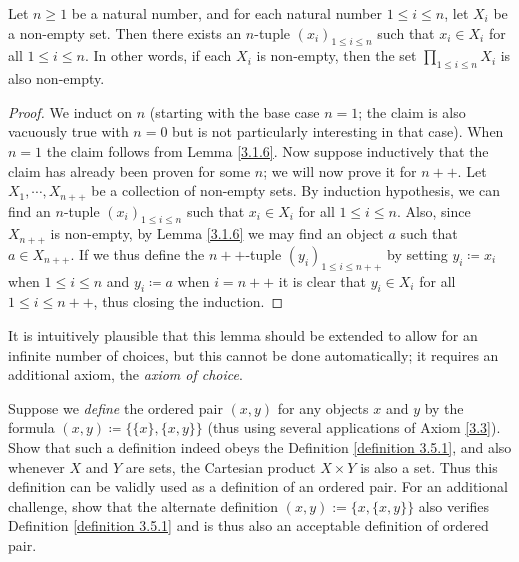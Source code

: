 \begin{lemma}\label{lemma 3.5.1}
Let \(n \geq 1\) be a natural number, and for each natural number \(1 \leq i \leq n\), let \(X_i\) be a non-empty set.
Then there exists an \(n\)-tuple \((x_i)_{1 \leq i \leq n}\) such that \(x_i \in X_i\) for all \(1 \leq i \leq n\).
In other words, if each \(X_i\) is non-empty, then the set \(\prod_{1 \leq i \leq n} X_i\) is also non-empty.
\end{lemma}

\begin{proof}
We induct on \(n\) (starting with the base case \(n = 1\); the claim is also vacuously true with \(n = 0\) but is not particularly interesting in that case).
When \(n = 1\) the claim follows from Lemma \ref{3.1.6}.
Now suppose inductively that the claim has already been proven for some \(n\);
we will now prove it for \(n++\).
Let \(X_1, \cdots, X_{n++}\) be a collection of non-empty sets.
By induction hypothesis, we can find an \(n\)-tuple \((x_i)_{1 \leq i \leq n}\) such that \(x_i \in X_i\) for all \(1 \leq i \leq n\).
Also, since \(X_{n++}\) is non-empty, by Lemma \ref{3.1.6} we may find an object \(a\) such that \(a \in X_{n++}\).
If we thus define the \(n++\)-tuple \((y_i)_{1 \leq i \leq n++}\) by setting \(y_i \coloneqq x_i\) when \(1 \leq i \leq n\) and \(y_i \coloneqq a\) when \(i = n++\) it is clear that \(y_i \in X_i\) for all \(1 \leq i \leq n++\), thus closing the induction.
\end{proof}

\begin{remark}
It is intuitively plausible that this lemma should be extended to allow for an infinite number of choices, but this cannot be done automatically;
it requires an additional axiom, the \emph{axiom of choice}.
\end{remark}

\begin{exercise}\label{exercise 3.5.1}
Suppose we \emph{define} the ordered pair \((x, y)\) for any objects \(x\) and \(y\) by the formula \((x, y) \coloneqq \{\{x\}, \{x, y\}\}\) (thus using several applications of
Axiom \ref{3.3}).
Show that such a definition indeed obeys the Definition \ref{definition 3.5.1}, and also whenever \(X\) and \(Y\) are sets, the Cartesian product \(X \times Y\) is also a set.
Thus this definition can be validly used as a definition of an ordered pair.
For an additional challenge, show that the alternate definition \((x, y) := \{x, \{x, y\}\}\) also verifies Definition \ref{definition 3.5.1} and is thus also an acceptable definition of ordered pair.
\end{exercise}

